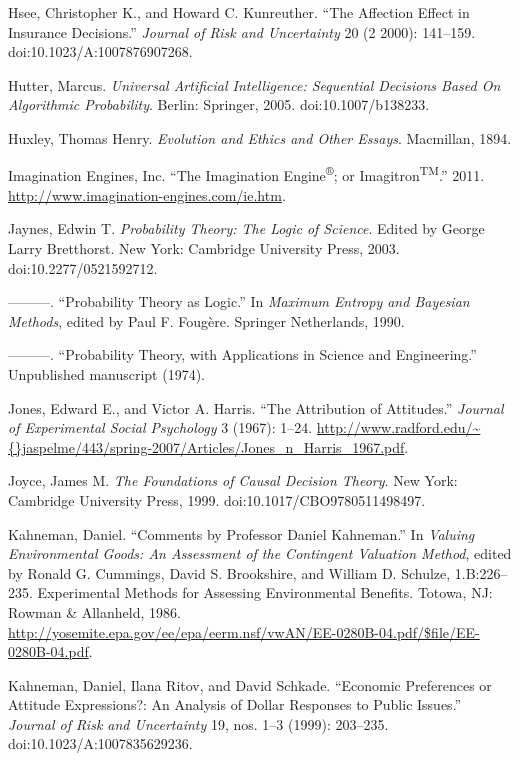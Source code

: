 \documentclass[letterpaper]{book}
\begin{document}
{
 Hsee, Christopher K., and Howard C. Kunreuther.
``The Affection Effect in Insurance
Decisions.'' \textit{Journal of Risk and Uncertainty}
20 (2 2000): 141--159. doi:10.1023/A:1007876907268.}

{
 Hutter, Marcus. \textit{Universal Artificial Intelligence:
Sequential Decisions Based On Algorithmic Probability}. Berlin:
Springer, 2005. doi:10.1007/b138233.}

{
 Huxley, Thomas Henry. \textit{Evolution and Ethics and Other
Essays}. Macmillan, 1894.}

{
 Imagination Engines, Inc. ``The Imagination
Engine\textsuperscript{®}; or
Imagitron\textsuperscript{TM}.'' 2011.
\url{http://www.imagination-engines.com/ie.htm}.}

{
 Jaynes, Edwin T. \textit{Probability Theory: The Logic of
Science}. Edited by George Larry Bretthorst. New York: Cambridge
University Press, 2003. doi:10.2277/0521592712.}

{
 {}---{}---{}---. ``Probability Theory as
Logic.'' In \textit{Maximum Entropy and Bayesian
Methods}, edited by Paul F. Fougère. Springer Netherlands, 1990.}

{
 {}---{}---{}---. ``Probability Theory, with
Applications in Science and Engineering.''
Unpublished manuscript (1974).}

{
 Jones, Edward E., and Victor A. Harris. ``The
Attribution of Attitudes.'' \textit{Journal of
Experimental Social Psychology} 3 (1967): 1--24.
\url{http://www.radford.edu/\~{}jaspelme/443/spring-2007/Articles/Jones\_n\_Harris\_1967.pdf}.}

{
 Joyce, James M. \textit{The Foundations of Causal Decision
Theory}. New York: Cambridge University Press, 1999.
doi:10.1017/CBO9780511498497.}

{
 Kahneman, Daniel. ``Comments by Professor Daniel
Kahneman.'' In \textit{Valuing Environmental Goods:
An Assessment of the Contingent Valuation Method}, edited by Ronald G.
Cummings, David S. Brookshire, and William D. Schulze, 1.B:226--235.
Experimental Methods for Assessing Environmental Benefits. Totowa, NJ:
Rowman \& Allanheld, 1986.
\url{http://yosemite.epa.gov/ee/epa/eerm.nsf/vwAN/EE-0280B-04.pdf/\$file/EE-0280B-04.pdf}.}

{
 Kahneman, Daniel, Ilana Ritov, and David Schkade.
``Economic Preferences or Attitude Expressions?: An
Analysis of Dollar Responses to Public Issues.''
\textit{Journal of Risk and Uncertainty} 19, nos. 1--3 (1999):
203--235. doi:10.1023/A:1007835629236.}
\end{document}

